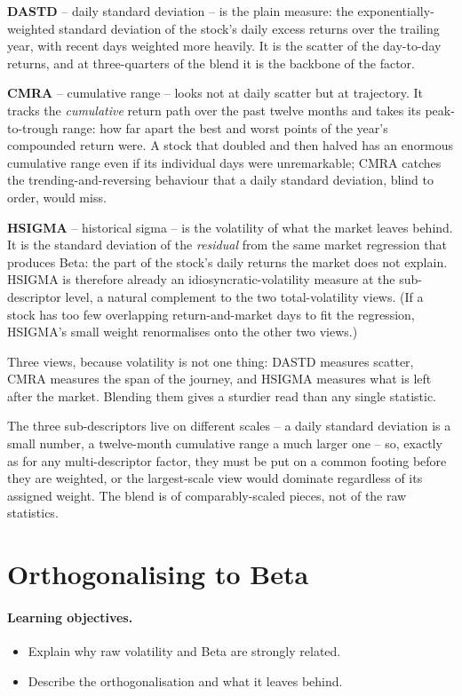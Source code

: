 \documentclass[11pt]{article}
\theoremstyle{definition}
\theoremstyle{plain}
\theoremstyle{remark}
\begin{document}
\textbf{DASTD} -- daily standard deviation -- is the plain measure: the exponentially-weighted standard deviation of the stock's daily excess returns over the trailing year, with recent days weighted more heavily. It is the scatter of the day-to-day returns, and at three-quarters of the blend it is the backbone of the factor.

\textbf{CMRA} -- cumulative range -- looks not at daily scatter but at trajectory. It tracks the \emph{cumulative} return path over the past twelve months and takes its peak-to-trough range: how far apart the best and worst points of the year's compounded return were. A stock that doubled and then halved has an enormous cumulative range even if its individual days were unremarkable; CMRA catches the trending-and-reversing behaviour that a daily standard deviation, blind to order, would miss.

\textbf{HSIGMA} -- historical sigma -- is the volatility of what the market leaves behind. It is the standard deviation of the \emph{residual} from the same market regression that produces Beta: the part of the stock's daily returns the market does not explain. HSIGMA is therefore already an idiosyncratic-volatility measure at the sub-descriptor level, a natural complement to the two total-volatility views. (If a stock has too few overlapping return-and-market days to fit the regression, HSIGMA's small weight renormalises onto the other two views.)

Three views, because volatility is not one thing: DASTD measures scatter, CMRA measures the span of the journey, and HSIGMA measures what is left after the market. Blending them gives a sturdier read than any single statistic.

\begin{pitfall}
The three sub-descriptors live on different scales -- a daily standard deviation is a small number, a twelve-month cumulative range a much larger one -- so, exactly as for any multi-descriptor factor, they must be put on a common footing before they are weighted, or the largest-scale view would dominate regardless of its assigned weight. The blend is of comparably-scaled pieces, not of the raw statistics.
\end{pitfall}

\section{Orthogonalising to Beta}\label{sec:ortho}

\paragraph{Learning objectives.}
\begin{itemize}[leftmargin=1.4em,topsep=2pt]
  \item Explain why raw volatility and Beta are strongly related.
  \item Describe the orthogonalisation and what it leaves behind.
\end{itemize}
\end{document}
